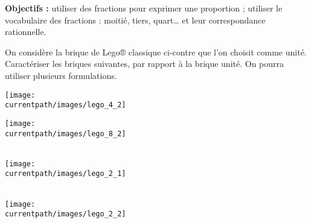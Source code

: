 \begin{activite}
    {\bf Objectifs :} utiliser des fractions pour exprimer une proportion ; utiliser le vocabulaire des fractions : moitié, tiers, quart\dots{} et leur correspondance rationnelle.

        \begin{minipage}{0.7\linewidth}
          On considère la brique de Lego® classique ci-contre que l'on choisit comme unité. Caractériser les briques suivantes, par rapport à la brique unité. On pourra utiliser plusieurs formulations.
        \end{minipage}
        \hfill
        \begin{minipage}{0.2\linewidth}
          \texttt{[image: \\currentpath/images/lego\_4\_2]}
        \end{minipage}

        \partie[]
        \begin{minipage}{0.36\linewidth}
            \begin{center}
                \texttt{[image: \\currentpath/images/lego\_8\_2]}\\ [2.5mm]
                \makebox[\linewidth]{\dotfill} \\ [2.5mm]
                \makebox[\linewidth]{\dotfill} 
            \end{center}
        \end{minipage}
        \hspace{15mm}
        \begin{minipage}{0.3\linewidth}
            \begin{center}
                \texttt{[image: \\currentpath/images/lego\_2\_1]}\\ [2.5mm]
                \makebox[\linewidth]{\dotfill} \\ [2.5mm]
                \makebox[\linewidth]{\dotfill}
            \end{center}
        \end{minipage}
        \hspace{15mm}
        \begin{minipage}{0.3\linewidth}
            \begin{center}
                \texttt{[image: \\currentpath/images/lego\_2\_2]} \\ [2.5mm]
                \makebox[\linewidth]{\dotfill} \\ [2.5mm]
                \makebox[\linewidth]{\dotfill}
            \end{center}
        \end{minipage}
 

\end{activite}
